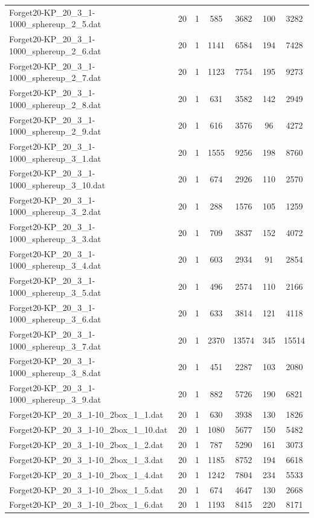 \begin{table}[!ht]
\begin{tabular}{lcccccc}
Forget20-KP\_20\_3\_1-1000\_sphereup\_2\_5.dat & 20 & 1 & 585 & 3682 & 100 & 3282 \\
Forget20-KP\_20\_3\_1-1000\_sphereup\_2\_6.dat & 20 & 1 & 1141 & 6584 & 194 & 7428 \\
Forget20-KP\_20\_3\_1-1000\_sphereup\_2\_7.dat & 20 & 1 & 1123 & 7754 & 195 & 9273 \\
Forget20-KP\_20\_3\_1-1000\_sphereup\_2\_8.dat & 20 & 1 & 631 & 3582 & 142 & 2949 \\
Forget20-KP\_20\_3\_1-1000\_sphereup\_2\_9.dat & 20 & 1 & 616 & 3576 & 96 & 4272 \\
Forget20-KP\_20\_3\_1-1000\_sphereup\_3\_1.dat & 20 & 1 & 1555 & 9256 & 198 & 8760 \\
Forget20-KP\_20\_3\_1-1000\_sphereup\_3\_10.dat & 20 & 1 & 674 & 2926 & 110 & 2570 \\
Forget20-KP\_20\_3\_1-1000\_sphereup\_3\_2.dat & 20 & 1 & 288 & 1576 & 105 & 1259 \\
Forget20-KP\_20\_3\_1-1000\_sphereup\_3\_3.dat & 20 & 1 & 709 & 3837 & 152 & 4072 \\
Forget20-KP\_20\_3\_1-1000\_sphereup\_3\_4.dat & 20 & 1 & 603 & 2934 & 91 & 2854 \\
Forget20-KP\_20\_3\_1-1000\_sphereup\_3\_5.dat & 20 & 1 & 496 & 2574 & 110 & 2166 \\
Forget20-KP\_20\_3\_1-1000\_sphereup\_3\_6.dat & 20 & 1 & 633 & 3814 & 121 & 4118 \\
Forget20-KP\_20\_3\_1-1000\_sphereup\_3\_7.dat & 20 & 1 & 2370 & 13574 & 345 & 15514 \\
Forget20-KP\_20\_3\_1-1000\_sphereup\_3\_8.dat & 20 & 1 & 451 & 2287 & 103 & 2080 \\
Forget20-KP\_20\_3\_1-1000\_sphereup\_3\_9.dat & 20 & 1 & 882 & 5726 & 190 & 6821 \\
Forget20-KP\_20\_3\_1-10\_2box\_1\_1.dat & 20 & 1 & 630 & 3938 & 130 & 1826 \\
Forget20-KP\_20\_3\_1-10\_2box\_1\_10.dat & 20 & 1 & 1080 & 5677 & 150 & 5482 \\
Forget20-KP\_20\_3\_1-10\_2box\_1\_2.dat & 20 & 1 & 787 & 5290 & 161 & 3073 \\
Forget20-KP\_20\_3\_1-10\_2box\_1\_3.dat & 20 & 1 & 1185 & 8752 & 194 & 6618 \\
Forget20-KP\_20\_3\_1-10\_2box\_1\_4.dat & 20 & 1 & 1242 & 7804 & 234 & 5533 \\
Forget20-KP\_20\_3\_1-10\_2box\_1\_5.dat & 20 & 1 & 674 & 4647 & 130 & 2668 \\
Forget20-KP\_20\_3\_1-10\_2box\_1\_6.dat & 20 & 1 & 1193 & 8415 & 220 & 8171 \\

\end{tabular}
\end{table}

